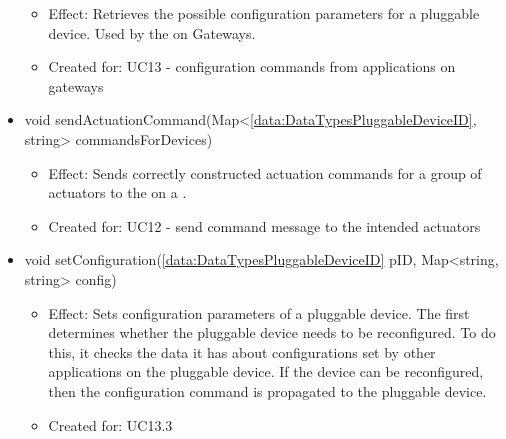 \begin{description}
\begin{itemize}[noitemsep,nolistsep,leftmargin=-.25cm]
        \begin{itemize}[noitemsep,nolistsep]
           \item Effect: Retrieves the possible configuration parameters for a pluggable device. Used by the  on Gateways.
\item Created for: UC13 - configuration commands from applications on gateways
        \end{itemize}
      \item \textsf{void sendActuationCommand(Map\textless{}\ref{data:DataTypesPluggableDeviceID}, string\textgreater{} commandsForDevices)}
        \begin{itemize}[noitemsep,nolistsep]
           \item Effect: Sends correctly constructed actuation commands for a group of actuators to the  on a .
\item Created for: UC12 - send command message to the intended actuators
        \end{itemize}
      \item \textsf{void setConfiguration(\ref{data:DataTypesPluggableDeviceID} pID, Map\textless{}string, string\textgreater{} config)}
        \begin{itemize}[noitemsep,nolistsep]
           \item Effect: Sets configuration parameters of a pluggable device. The  first determines whether the pluggable device needs to be reconfigured. To do this, it checks the data it has about configurations set by other applications on the pluggable device. If the device can be reconfigured, then the configuration command is propagated to the pluggable device.
\item Created for: UC13.3
        \end{itemize}
    \end{itemize}
    \end{description}

